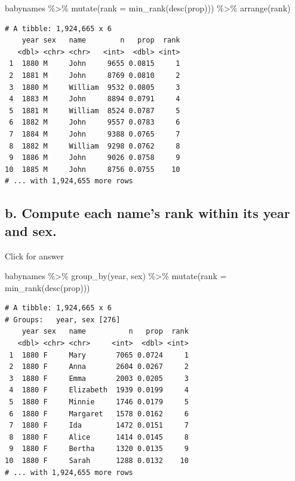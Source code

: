 \documentclass[
]{book}
\newenvironment{Shaded}{\begin{snugshade}}{\end{snugshade}}
\newcommand{\AttributeTok}[1]{\textcolor[rgb]{0.77,0.63,0.00}{#1}}
\newcommand{\FunctionTok}[1]{\textcolor[rgb]{0.00,0.00,0.00}{#1}}
\newcommand{\NormalTok}[1]{#1}
\newcommand{\SpecialCharTok}[1]{\textcolor[rgb]{0.00,0.00,0.00}{#1}}
\begin{document}
\begin{Shaded}
\begin{Highlighting}[]
\NormalTok{babynames }\SpecialCharTok{\%\textgreater{}\%} \FunctionTok{mutate}\NormalTok{(}\AttributeTok{rank =} \FunctionTok{min\_rank}\NormalTok{(}\FunctionTok{desc}\NormalTok{(prop))) }\SpecialCharTok{\%\textgreater{}\%} \FunctionTok{arrange}\NormalTok{(rank)}
\end{Highlighting}
\end{Shaded}

\begin{verbatim}
# A tibble: 1,924,665 x 6
    year sex   name        n   prop  rank
   <dbl> <chr> <chr>   <int>  <dbl> <int>
 1  1880 M     John     9655 0.0815     1
 2  1881 M     John     8769 0.0810     2
 3  1880 M     William  9532 0.0805     3
 4  1883 M     John     8894 0.0791     4
 5  1881 M     William  8524 0.0787     5
 6  1882 M     John     9557 0.0783     6
 7  1884 M     John     9388 0.0765     7
 8  1882 M     William  9298 0.0762     8
 9  1886 M     John     9026 0.0758     9
10  1885 M     John     8756 0.0755    10
# ... with 1,924,655 more rows
\end{verbatim}

\hypertarget{b.-compute-each-names-rank-within-its-year-and-sex.}{%
\subsection{b. Compute each name's rank within its year and sex.}\label{b.-compute-each-names-rank-within-its-year-and-sex.}}

Click for answer

\begin{Shaded}
\begin{Highlighting}[]
\NormalTok{babynames }\SpecialCharTok{\%\textgreater{}\%} \FunctionTok{group\_by}\NormalTok{(year, sex) }\SpecialCharTok{\%\textgreater{}\%} \FunctionTok{mutate}\NormalTok{(}\AttributeTok{rank =} \FunctionTok{min\_rank}\NormalTok{(}\FunctionTok{desc}\NormalTok{(prop)))}
\end{Highlighting}
\end{Shaded}

\begin{verbatim}
# A tibble: 1,924,665 x 6
# Groups:   year, sex [276]
    year sex   name          n   prop  rank
   <dbl> <chr> <chr>     <int>  <dbl> <int>
 1  1880 F     Mary       7065 0.0724     1
 2  1880 F     Anna       2604 0.0267     2
 3  1880 F     Emma       2003 0.0205     3
 4  1880 F     Elizabeth  1939 0.0199     4
 5  1880 F     Minnie     1746 0.0179     5
 6  1880 F     Margaret   1578 0.0162     6
 7  1880 F     Ida        1472 0.0151     7
 8  1880 F     Alice      1414 0.0145     8
 9  1880 F     Bertha     1320 0.0135     9
10  1880 F     Sarah      1288 0.0132    10
# ... with 1,924,655 more rows
\end{verbatim}
\end{document}
